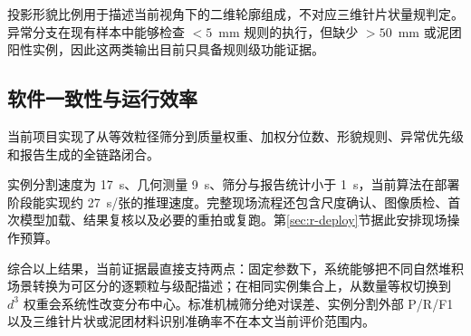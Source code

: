投影形貌比例用于描述当前视角下的二维轮廓组成，不对应三维针片状量规判定。异常分支在现有样本中能够检查 $<5$~mm 规则的执行，但缺少 $>50$~mm 或泥团阳性实例，因此这两类输出目前只具备规则级功能证据。

\subsection{软件一致性与运行效率}

当前项目实现了从等效粒径筛分到质量权重、加权分位数、形貌规则、异常优先级和报告生成的全链路闭合。

实例分割速度为 17~s、几何测量 9~s、筛分与报告统计小于 1~s，当前算法在部署阶段能实现约 27~s/张的推理速度。完整现场流程还包含尺度确认、图像质检、首次模型加载、结果复核以及必要的重拍或复跑。第\ref{sec:r-deploy}节据此安排现场操作预算。

综合以上结果，当前证据最直接支持两点：固定参数下，系统能够把不同自然堆积场景转换为可区分的逐颗粒与级配描述；在相同实例集合上，从数量等权切换到 $d^3$ 权重会系统性改变分布中心。标准机械筛分绝对误差、实例分割外部 P/R/F1 以及三维针片状或泥团材料识别准确率不在本文当前评价范围内。
